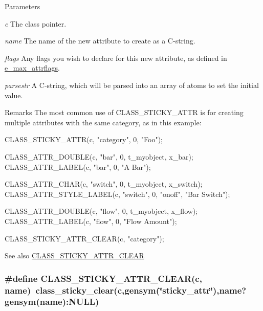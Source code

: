\begin{DoxyParams}{Parameters}
\item[{\em c}]The class pointer. \item[{\em name}]The name of the new attribute to create as a C-\/string. \item[{\em flags}]Any flags you wish to declare for this new attribute, as defined in \hyperlink{group__attr_gaf296cfc6741bb19207f6ed8062809115}{e\_\-max\_\-attrflags}. \item[{\em parsestr}]A C-\/string, which will be parsed into an array of atoms to set the initial value.\end{DoxyParams}
\begin{DoxyRemark}{Remarks}
The most common use of CLASS\_\-STICKY\_\-ATTR is for creating multiple attributes with the same category, as in this example: 
\begin{DoxyCode}
    CLASS_STICKY_ATTR(c, "category", 0, "Foo");
    
    CLASS_ATTR_DOUBLE(c, "bar", 0, t_myobject, x_bar);
    CLASS_ATTR_LABEL(c, "bar", 0, "A Bar");

    CLASS_ATTR_CHAR(c, "switch", 0, t_myobject, x_switch);
    CLASS_ATTR_STYLE_LABEL(c, "switch", 0, "onoff", "Bar Switch");

    CLASS_ATTR_DOUBLE(c, "flow", 0, t_myobject, x_flow);
    CLASS_ATTR_LABEL(c, "flow", 0, "Flow Amount");
    
    CLASS_STICKY_ATTR_CLEAR(c, "category");
\end{DoxyCode}

\end{DoxyRemark}
\begin{DoxySeeAlso}{See also}
\hyperlink{group__attr_gadf3ca4c22b0273a96f5644788489970b}{CLASS\_\-STICKY\_\-ATTR\_\-CLEAR} 
\end{DoxySeeAlso}
\hypertarget{group__attr_gadf3ca4c22b0273a96f5644788489970b}{
\subsubsection[{CLASS\_\-STICKY\_\-ATTR\_\-CLEAR}]{\setlength{\rightskip}{0pt plus 5cm}\#define CLASS\_\-STICKY\_\-ATTR\_\-CLEAR(c, \/  name)~class\_\-sticky\_\-clear(c,gensym(\char`\"{}sticky\_\-attr\char`\"{}),name?gensym(name):NULL)}}
\label{group__attr_gadf3ca4c22b0273a96f5644788489970b}


